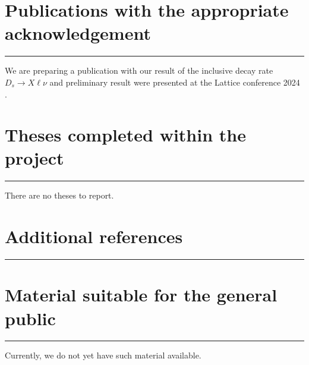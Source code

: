 \documentclass [a4paper, 11pt]{article}
\begin{document}
\section{Publications with the appropriate acknowledgement}
\rule{\textwidth}{0.4pt}

We are preparing a publication with our result of the inclusive decay rate $D_s\to X\ell\nu$ and 
preliminary result were presented at the Lattice conference 2024 
\cite{talklatt2024_ale,talklatt2024_chr}.

\begin{thebibliography}{99}



\end{thebibliography}


\section{Theses completed within the project}
\rule{\textwidth}{0.4pt}

There are no theses to report.

\section{Additional references}
\rule{\textwidth}{0.4pt}



\section{Material suitable for the general public}
\rule{\textwidth}{0.4pt}

Currently, we do not yet have such material available.
\end{document}
